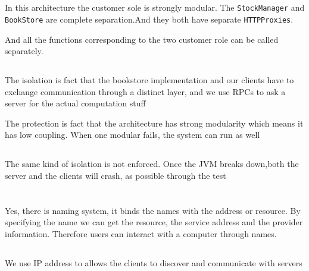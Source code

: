\documentclass[11pt]{article}
\begin{document}
\section{}
\subsection{}
In this architecture the customer sole is strongly modular. The \texttt{StockManager} and \texttt{BookStore} are complete separation.And they both have separate \texttt{HTTPProxies}. 

And all the functions corresponding to the two customer role can be called separately.


\subsection{}
The isolation is fact that the bookstore implementation and our clients have to exchange communication through a distinct layer, and we use RPCs to ask a server for the actual computation stuff

The protection is fact that the architecture has strong modularity which means it has low coupling. When one modular fails, the system can run as well

\subsection{}
The same kind of isolation is not enforced. Once the JVM breaks down,both the server and the clients will crash, as possible through the test


\section{}
\subsection{}
Yes, there is naming system, it binds the names with the address or resource. By specifying the name  we can get the resource, the service address and the provider information. Therefore users can interact with a computer through names.

\subsection{}
We use IP address to allows the clients to discover and communicate with servers

\section{}
\end{document}
